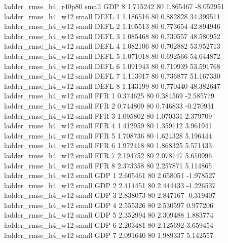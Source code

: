    ladder_rmse_h4_r40p80      small      GDP                 8 1.715242 80       1.865467          -8.052951
      ladder_rmse_h4_w12      small     DEFL                 1 1.186516 80       0.882828          34.399511
      ladder_rmse_h4_w12      small     DEFL                 2 1.105513 80       0.773654          42.894946
      ladder_rmse_h4_w12      small     DEFL                 3 1.085468 80       0.730557          48.580952
      ladder_rmse_h4_w12      small     DEFL                 4 1.082106 80       0.702882          53.952713
      ladder_rmse_h4_w12      small     DEFL                 5 1.071018 80       0.692566          54.644872
      ladder_rmse_h4_w12      small     DEFL                 6 1.091943 80       0.710939          53.591768
      ladder_rmse_h4_w12      small     DEFL                 7 1.113917 80       0.736877          51.167330
      ladder_rmse_h4_w12      small     DEFL                 8 1.143199 80       0.770440          48.382647
      ladder_rmse_h4_w12      small      FFR                 1 0.374625 80       0.384569          -2.585779
      ladder_rmse_h4_w12      small      FFR                 2 0.744809 80       0.746833          -0.270931
      ladder_rmse_h4_w12      small      FFR                 3 1.095802 80       1.070331           2.379709
      ladder_rmse_h4_w12      small      FFR                 4 1.412959 80       1.359112           3.961941
      ladder_rmse_h4_w12      small      FFR                 5 1.708736 80       1.624328           5.196444
      ladder_rmse_h4_w12      small      FFR                 6 1.972418 80       1.868325           5.571433
      ladder_rmse_h4_w12      small      FFR                 7 2.194752 80       2.078147           5.610996
      ladder_rmse_h4_w12      small      FFR                 8 2.373358 80       2.257871           5.114865
      ladder_rmse_h4_w12      small      GDP                 1 2.605461 80       2.658051          -1.978527
      ladder_rmse_h4_w12      small      GDP                 2 2.414451 80       2.444433          -1.226537
      ladder_rmse_h4_w12      small      GDP                 3 2.838073 80       2.847167          -0.319407
      ladder_rmse_h4_w12      small      GDP                 4 2.555326 80       2.530597           0.977206
      ladder_rmse_h4_w12      small      GDP                 5 2.352994 80       2.309488           1.883774
      ladder_rmse_h4_w12      small      GDP                 6 2.203481 80       2.125692           3.659454
      ladder_rmse_h4_w12      small      GDP                 7 2.091640 80       1.989337           5.142557
